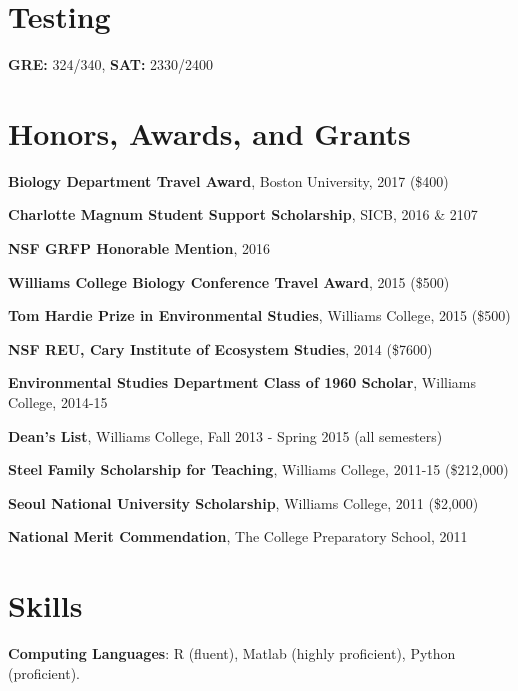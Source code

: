 \documentclass[margin,line]{res}
\begin{document}
\begin{resume}
\section{\sc Testing} 
{\bf GRE:} 324/340, 
{\bf SAT:} 2330/2400

\section{\sc Honors, Awards, and Grants} 

{\bf Biology Department Travel Award}, Boston University, 2017 (\$400)
\vspace*{-3.5mm}

{\bf Charlotte  Magnum	Student	Support	Scholarship}, SICB, 2016 \& 2107
\vspace*{-3.5mm}

{\bf NSF GRFP Honorable Mention}, 2016 
\vspace*{-3.5mm}

{\bf Williams College Biology Conference Travel Award}, 2015 (\$500)
\vspace*{-3.5mm}

{\bf Tom Hardie Prize in Environmental Studies}, Williams College, 2015 (\$500)
\vspace*{-3.5mm}

{\bf NSF REU, Cary Institute of Ecosystem Studies}, 2014 (\$7600)
\vspace*{-3.5mm}

{\bf Environmental Studies Department Class of 1960 Scholar}, Williams College, 2014-15
\vspace*{-3.5mm}

{\bf Dean's List}, Williams College, Fall 2013 - Spring 2015 (all semesters)
\vspace*{-3.5mm}

{\bf Steel Family Scholarship for Teaching}, Williams College, 2011-15 (\$212,000)
\vspace*{-3.5mm}

{\bf Seoul National University Scholarship}, Williams College, 2011 (\$2,000)
\vspace*{-3.5mm}

{\bf National Merit Commendation}, The College Preparatory School, 2011


\section{\sc Skills} 
{\bf Computing Languages}:  R (fluent), Matlab (highly proficient), Python (proficient).  
\vspace*{-3mm}


\end{resume}
\end{document}
